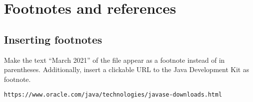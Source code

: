 \section{Footnotes and references}

\subsection{Inserting footnotes}

Make the text \enquote{March 2021} of the file 
 appear as a footnote instead of in 
parentheses. Additionally, insert a clickable URL to the Java Development Kit 
as footnote.

\texttt{https://www.oracle.com/java/technologies/javase-downloads.html}
